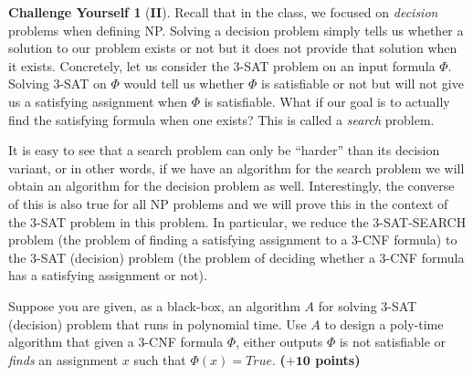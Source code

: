 \documentclass{article}
\theoremstyle{definition}
\newtheorem*{challenge}{Challenge Yourself}
\newcommand{\grade}[1]{\hfill{\textbf{($\mathbf{#1}$ points)}}}
\begin{document}
\begin{challenge}[\textbf{II}] 
	Recall that in the class, we  focused on \emph{decision} problems when defining NP. Solving a decision problem simply tells us whether a solution to our problem exists or not but  it does not provide that solution when it 
	exists. Concretely, let us consider the 3-SAT problem on an input formula $\Phi$. Solving 3-SAT on $\Phi$ would  tell us whether $\Phi$ is satisfiable or not but will not give us a satisfying assignment when $\Phi$ is satisfiable. 
	What if our goal is to actually find the satisfying formula when one exists? This is called a \emph{search} problem. 
	
	It is easy to see that a search problem can only be ``harder'' than its decision variant, or in other words, if we have an algorithm for the search problem we will obtain an algorithm for the decision problem as well. Interestingly, the converse 
	of this is also true for all NP problems and we will prove this in the context of the 3-SAT problem in this problem. In particular, we reduce the 3-SAT-SEARCH problem (the problem of finding a satisfying assignment to a 3-CNF formula) 
	to the 3-SAT (decision) problem (the problem of deciding whether a 3-CNF formula has a satisfying assignment or not). 
	
	Suppose you are given, as a black-box, an algorithm $A$ for solving 3-SAT (decision) problem that runs in polynomial time. Use $A$ to design a poly-time algorithm that given a 3-CNF formula $\Phi$, either outputs $\Phi$ is not satisfiable or 
	\emph{finds} an assignment $x$ such that $\Phi(x) = True$. \grade{+10}
\end{challenge}
\end{document}
